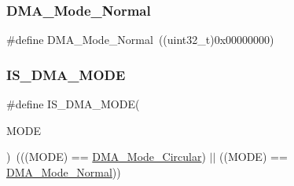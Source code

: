 \mbox{\label{group___d_m_a__circular__normal__mode_ga36400f5b5095f1102ede4760d7a5959c}} 
\subsubsection{\texorpdfstring{DMA\_Mode\_Normal}{DMA\_Mode\_Normal}}
{\footnotesize\ttfamily \#define D\+M\+A\+\_\+\+Mode\+\_\+\+Normal~((uint32\+\_\+t)0x00000000)}

\mbox{\label{group___d_m_a__circular__normal__mode_gad88ee5030574d6a573904378fb62c7ac}} 
\subsubsection{\texorpdfstring{IS\_DMA\_MODE}{IS\_DMA\_MODE}}
{\footnotesize\ttfamily \#define I\+S\+\_\+\+D\+M\+A\+\_\+\+M\+O\+DE(\begin{DoxyParamCaption}\item[{}]{M\+O\+DE }\end{DoxyParamCaption})~(((M\+O\+DE) == \mbox{\hyperlink{group___d_m_a__circular__normal__mode_ga36327b14c302098fbc5823ac3f1ae020}{D\+M\+A\+\_\+\+Mode\+\_\+\+Circular}}) $\vert$$\vert$ ((M\+O\+DE) == \mbox{\hyperlink{group___d_m_a__circular__normal__mode_ga36400f5b5095f1102ede4760d7a5959c}{D\+M\+A\+\_\+\+Mode\+\_\+\+Normal}}))}

